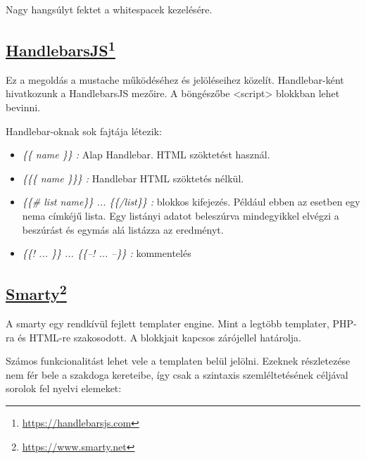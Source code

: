 Nagy hangsúlyt fektet a whitespacek kezelésére.


\subsection[HandlebarsJS]{\href{https://handlebarsjs.com}{HandlebarsJS}\footnote{\url{https://handlebarsjs.com}}}
\label{sec:hjs}
Ez a megoldás a mustache működéséhez és jelöléseihez közelít.
Handlebar-ként hivatkozunk a HandlebarsJS mezőire.
A böngészőbe <script> blokkban lehet bevinni.


Handlebar-oknak sok fajtája létezik:
\begin{itemize}
\item \emph{\textit{\{\{ name \}\}} :} 
Alap Handlebar.
HTML szöktetést használ.
\item \emph{\textit{\{\{\{ name \}\}\}} :} 
Handlebar HTML szöktetés nélkül.
\item \emph{\textit{\{\{\# list name\}\} ... \{\{/list\}\} }:} 
blokkos kifejezés.
Például ebben az esetben egy nema címkéjű lista.
Egy listányi adatot beleszúrva mindegyikkel elvégzi a beszúrást és egymás alá listázza az eredményt.
\item \emph{\textit{\{\{! ... \}\} ... \{\{--! ... --\}\}} :} kommentelés
\end{itemize}


\subsection[Smarty]{\href{https://www.smarty.net}{Smarty}\footnote{\url{https://www.smarty.net}}}
\label{sec:smarty}
A smarty egy rendkívül fejlett templater engine.
Mint a legtöbb templater, PHP-ra és  HTML-re szakosodott.
A blokkjait kapcsos zárójellel határolja.

Számos funkcionalitást lehet vele a templaten belül jelölni.
Ezeknek részletezése nem fér bele a szakdoga kereteibe, így csak a szintaxis szemléltetésének céljával sorolok fel nyelvi elemeket:

